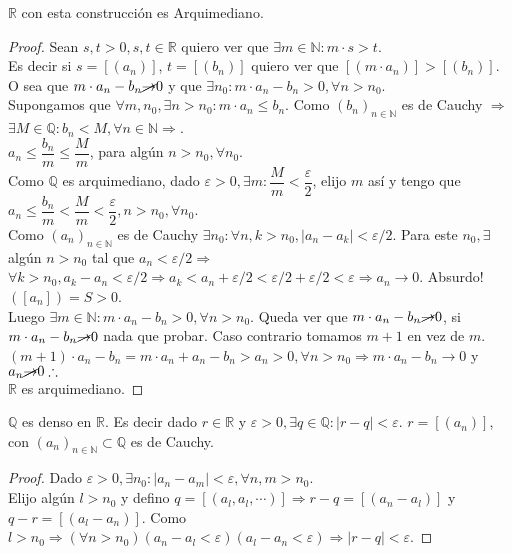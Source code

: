 \begin{theorem}
  $\mathbb{R}$ con esta construcción es Arquimediano.
  \begin{proof}
    Sean $s, t > 0, s, t \in \mathbb{R}$ quiero ver que $\exists m \in \mathbb{N} : m \cdot s > t$. \\
    Es decir si $s = [(a_n)]$, $t = [(b_n)]$ quiero ver que $[(m \cdot a_n)] > [(b_n)]$. O sea que $m \cdot a_n - b_n \cancel{\to} 0$ y que $\exists n_0 : m \cdot a_n - b_n > 0, \forall n> n_0$. \\

    Supongamos que $\forall m, n_0, \exists n>n_0 : m \cdot a_n \leq b_n$.
    Como $(b_n)_{n \in \mathbb{N}}$ es de Cauchy $\Rightarrow$ $\exists M \in \mathbb{Q} : b_n < M, \forall n \in \mathbb{N} \Rightarrow$. \\
    $a_n \leq \dfrac{b_n}{m} \leq \dfrac{M}{m}$, para algún $n > n_0, \forall n_0$. \\
    Como $\mathbb{Q}$ es arquimediano, dado $\varepsilon > 0, \exists m : \dfrac{M}{m} < \dfrac{\varepsilon}{2}$, elijo $m$ así y tengo que $a_n \leq \dfrac{b_n}{m} < \dfrac{M}{m} < \dfrac{\varepsilon}{2}, n > n_0, \forall n_0$. \\
    Como $(a_n)_{n \in \mathbb{N}}$ es de Cauchy $\exists n_0 : \forall n,k > n_0, |a_n - a_k| < \varepsilon/2$. Para este $n_0, \exists$ algún $n > n_0$ tal que $a_n < \varepsilon / 2 \Rightarrow$ \\
    $\forall k > n_0, a_k - a_n < \varepsilon / 2 \Rightarrow a_k < a_n + \varepsilon / 2 < \varepsilon / 2 + \varepsilon / 2 < \varepsilon \Rightarrow a_n \to 0$. Absurdo! $([a_n]) = S > 0$. \\

    Luego $\exists m \in \mathbb{N} : m \cdot a_n - b_n > 0, \forall n > n_0$. Queda ver que $m \cdot a_n - b_n \cancel{\to} 0$, si $m \cdot a_n - b_n \cancel{\to} 0$ nada que probar. Caso contrario tomamos $m+1$ en vez de $m$. \\
    $(m+1) \cdot a_n - b_n = m \cdot a_n + a_n - b_n > a_n > 0, \forall n > n_0 \Rightarrow m \cdot a_n - b_n \to 0$ y $a_n \cancel{\to} 0 \therefore$ \\
    $\mathbb{R}$ es arquimediano.
  \end{proof}
\end{theorem}

\begin{theorem}
  $\mathbb{Q}$ es denso en $\mathbb{R}$. Es decir dado $r \in \mathbb{R}$ y $\varepsilon > 0, \exists q \in \mathbb{Q} : |r-q| < \varepsilon$. $r = [(a_n)]$, con $(a_n)_{n \in \mathbb{N}} \subset \mathbb{Q}$ es de Cauchy.

  \begin{proof}
    Dado $\varepsilon > 0, \exists n_0 : |a_n - a_m| < \varepsilon, \forall n, m > n_0$. \\
    Elijo algún $l > n_0$ y defino $q = [(a_l, a_l, \cdots)] \Rightarrow r-q = [(a_n - a_l)]$ y $q-r = [(a_l - a_n)]$.
    Como $l > n_0 \Rightarrow (\forall n > n_0)(a_n-a_l < \varepsilon)(a_l - a_n < \varepsilon) \Rightarrow |r-q| < \varepsilon$.
  \end{proof}
\end{theorem}

